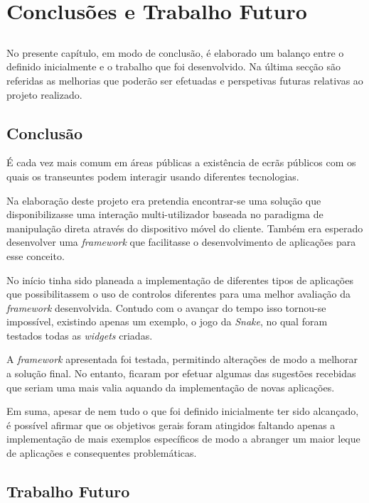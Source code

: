 \chapter{Conclusões e Trabalho Futuro} \label{chap:concl}

\section*{}

No presente capítulo, em modo de conclusão, é elaborado um balanço entre o definido inicialmente e o trabalho que foi desenvolvido.
Na última secção são referidas as melhorias que poderão ser efetuadas e perspetivas futuras relativas ao projeto realizado.

\section{Conclusão}

É cada vez mais comum em áreas públicas a existência de ecrãs públicos com os quais os transeuntes podem interagir usando diferentes tecnologias.

Na elaboração deste projeto era pretendia encontrar-se uma solução que disponibilizasse uma interação multi-utilizador baseada no paradigma de manipulação direta através do dispositivo móvel do cliente. Também era esperado desenvolver uma \textit{framework} que facilitasse o desenvolvimento de aplicações para esse conceito.

No início tinha sido planeada a implementação de diferentes tipos de aplicações que possibilitassem o uso de controlos diferentes para uma melhor avaliação da \textit{framework} desenvolvida. Contudo com o avançar do tempo isso tornou-se impossível, existindo apenas um exemplo, o jogo da \textit{Snake}, no qual foram testados todas as \textit{widgets} criadas. 

A \textit{framework} apresentada foi testada, permitindo alterações de modo a melhorar a solução final. No entanto, ficaram por efetuar algumas das sugestões recebidas que seriam uma mais valia aquando da implementação de novas aplicações.

Em suma, apesar de nem tudo o que foi definido inicialmente ter sido alcançado, é possível afirmar que os objetivos gerais foram atingidos faltando apenas a implementação de mais exemplos específicos de modo a abranger um maior leque de aplicações e consequentes problemáticas.

\section{Trabalho Futuro}

